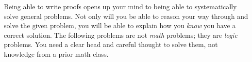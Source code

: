 \documentclass[12 pt]{article}
\theoremstyle{definition}
\theoremstyle{plain}
\theoremstyle{mytheorem}
\theoremstyle{myexample}
\theoremstyle{mydefinition}
\begin{document}
Being able to write proofs opens up your mind to being able to systematically solve general problems.  Not only will you be able to reason your way through and solve the given problem, you will be able to explain how you \textit{know} you have a correct solution.  The following problems are not \textit{math} problems; they are \textit{logic} problems.  You need a clear head and careful thought to solve them, not knowledge from a prior math class.\\

\begin{center}
\end{center}
\end{document}
